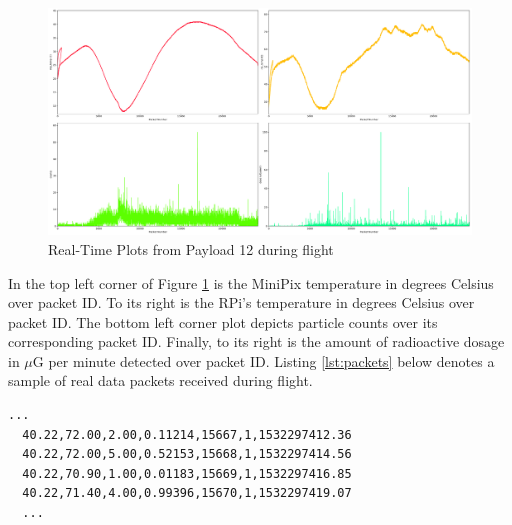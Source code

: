 \begin{figure}[H]
	\begin{center}
	\includegraphics[width=\textwidth]{figures/2018EnvironmentalPlots.pdf}
	\caption{Real-Time Plots from Payload 12 during flight}
	\label{fig:rtp}
	\end{center}
\end{figure}

In the top left corner of Figure \ref{fig:rtp} is the MiniPix temperature in degrees Celsius over packet ID. 
To its right is the RPi's temperature in degrees Celsius over packet ID. 
The bottom left corner plot depicts particle counts over its corresponding packet ID. 
Finally, to its right is the amount of radioactive dosage in $\mu$G per minute detected over packet ID.
Listing \ref{lst:packets} below denotes a sample of real data packets received during flight. 

\lstset{basicstyle=\small, numbers=left, xleftmargin=2em, frame=tb, label = Downlinks, framexleftmargin=1.5em}
\begin{lstlisting}[caption = Sample of downlinked data packets ID: 15667 - 15670, label={lst:packets}]
  ...
  40.22,72.00,2.00,0.11214,15667,1,1532297412.36
  40.22,72.00,5.00,0.52153,15668,1,1532297414.56
  40.22,70.90,1.00,0.01183,15669,1,1532297416.85
  40.22,71.40,4.00,0.99396,15670,1,1532297419.07
  ...
\end{lstlisting}